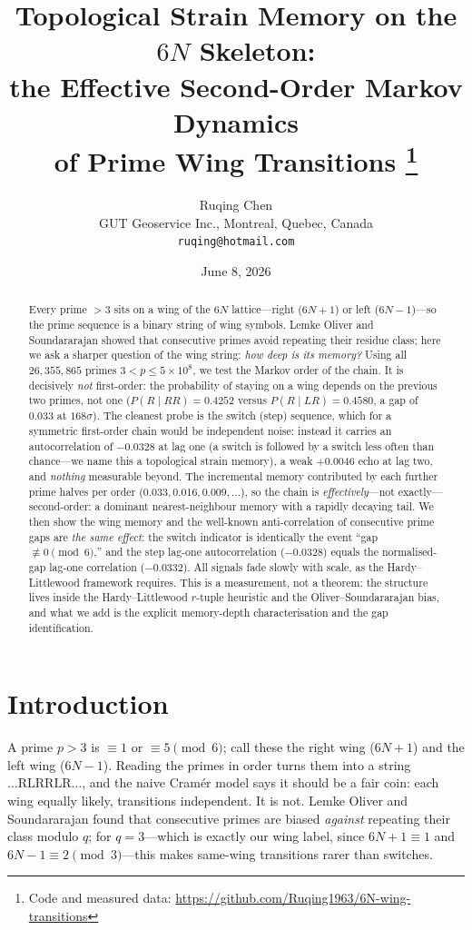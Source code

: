 \documentclass[11pt]{article}
\title{\bf Topological Strain Memory on the $6N$ Skeleton:\\
the Effective Second-Order Markov Dynamics\\
of Prime Wing Transitions%
\thanks{Code and measured data: \url{https://github.com/Ruqing1963/6N-wing-transitions}}}
\author{Ruqing Chen\\
\small GUT Geoservice Inc., Montreal, Quebec, Canada\\
\small \texttt{ruqing@hotmail.com}}
\date{June 8, 2026}
\theoremstyle{definition}
\begin{document}
\maketitle

\begin{abstract}
Every prime $>3$ sits on a wing of the $6N$ lattice---right ($6N{+}1$) or left ($6N{-}1$)---so the
prime sequence is a binary string of wing symbols. Lemke Oliver and Soundararajan showed that
consecutive primes avoid repeating their residue class; here we ask a sharper question of the wing
string: \emph{how deep is its memory?} Using all $26{,}355{,}865$ primes $3<p\le5\times10^{8}$, we test
the Markov order of the chain. It is decisively \emph{not} first-order: the probability of staying on a
wing depends on the previous two primes, not one ($P(R\mid RR)=0.4252$ versus $P(R\mid LR)=0.4580$, a
gap of $0.033$ at $168\sigma$). The cleanest probe is the switch (step) sequence, which for a symmetric
first-order chain would be independent noise: instead it carries an autocorrelation of $-0.0328$ at lag
one (a switch is followed by a switch less often than chance---we name this a topological strain
memory), a weak $+0.0046$ echo at lag two, and \emph{nothing} measurable beyond. The incremental memory
contributed by each further prime halves per order ($0.033,0.016,0.009,\dots$), so the chain is
\emph{effectively}---not exactly---second-order: a dominant nearest-neighbour memory with a rapidly
decaying tail. We then show the wing memory and the well-known anti-correlation of consecutive prime
gaps are \emph{the same effect}: the switch indicator is identically the event ``gap $\not\equiv0
\pmod6$,'' and the step lag-one autocorrelation ($-0.0328$) equals the normalised-gap lag-one
correlation ($-0.0332$). All signals fade slowly with scale, as the Hardy--Littlewood framework
requires. This is a measurement, not a theorem: the structure lives inside the Hardy--Littlewood
$r$-tuple heuristic and the Oliver--Soundararajan bias, and what we add is the explicit memory-depth
characterisation and the gap identification.
\end{abstract}

\section{Introduction}
A prime $p>3$ is $\equiv1$ or $\equiv5\pmod6$; call these the right wing ($6N{+}1$) and the left wing
($6N{-}1$). Reading the primes in order turns them into a string $\dots\mathrm{RLRRLR}\dots$, and the
naive Cram\'er model says it should be a fair coin: each wing equally likely, transitions independent.
It is not. Lemke Oliver and Soundararajan \cite{OS} found that consecutive primes are biased
\emph{against} repeating their class modulo $q$; for $q=3$---which is exactly our wing label, since
$6N{+}1\equiv1$ and $6N{-}1\equiv2\pmod3$---this makes same-wing transitions rarer than switches.
\end{document}
